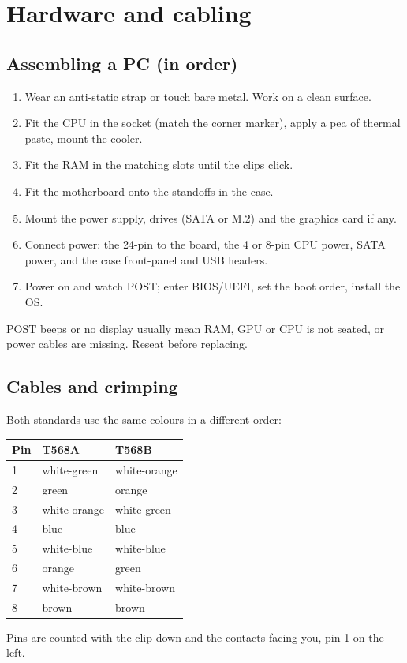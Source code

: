 \documentclass[11pt,a4paper]{article}
\begin{document}
\clearpage
\section{Hardware and cabling}
\subsection{Assembling a PC (in order)}
\begin{enumerate}
\item Wear an anti-static strap or touch bare metal. Work on a clean surface.
\item Fit the CPU in the socket (match the corner marker), apply a pea of thermal paste, mount the cooler.
\item Fit the RAM in the matching slots until the clips click.
\item Fit the motherboard onto the standoffs in the case.
\item Mount the power supply, drives (SATA or M.2) and the graphics card if any.
\item Connect power: the 24-pin to the board, the 4 or 8-pin CPU power, SATA power, and the case front-panel and USB headers.
\item Power on and watch POST; enter BIOS/UEFI, set the boot order, install the OS.
\end{enumerate}
POST beeps or no display usually mean RAM, GPU or CPU is not seated, or power cables are missing. Reseat before replacing.

\subsection{Cables and crimping}
Both standards use the same colours in a different order:

\begin{center}\small\renewcommand{\arraystretch}{1.18}\setlength{\tabcolsep}{9pt}
\begin{tabular}{@{}lll@{}}
\toprule
\textbf{\color{slate}Pin} & \textbf{\color{slate}T568A} & \textbf{\color{slate}T568B} \\ \midrule
1 & white-green & white-orange \\
2 & green & orange \\
3 & white-orange & white-green \\
4 & blue & blue \\
5 & white-blue & white-blue \\
6 & orange & green \\
7 & white-brown & white-brown \\
8 & brown & brown \\
\bottomrule
\end{tabular}\end{center}
Pins are counted with the clip down and the contacts facing you, pin 1 on the left.
\end{document}
